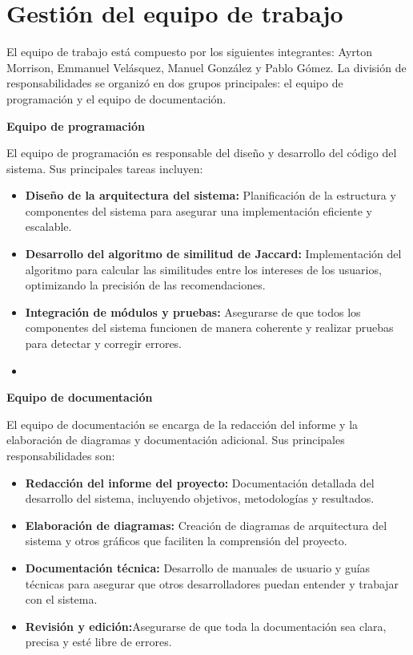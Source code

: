 \section{Gestión del equipo de trabajo}
El equipo de trabajo está compuesto por los siguientes integrantes: Ayrton Morrison, Emmanuel Velásquez, Manuel González y Pablo Gómez. La división de responsabilidades se organizó en dos grupos principales: el equipo de programación y el equipo de documentación.

\textbf{Equipo de programación}

El equipo de programación es responsable del diseño y desarrollo del código del sistema. Sus principales tareas incluyen:

\begin{itemize}
    \item \textbf{Diseño de la arquitectura del sistema:} Planificación de la estructura y componentes del sistema para asegurar una implementación eficiente y escalable.
    \item \textbf{Desarrollo del algoritmo de similitud de Jaccard:} Implementación del algoritmo para calcular las similitudes entre los intereses de los usuarios, optimizando la precisión de las recomendaciones.
    \item \textbf{Integración de módulos y pruebas:} Asegurarse de que todos los componentes del sistema funcionen de manera coherente y realizar pruebas para detectar y corregir errores.
    \item 
\end{itemize}

\textbf{Equipo de documentación}

El equipo de documentación se encarga de la redacción del informe y la elaboración de diagramas y documentación adicional. Sus principales responsabilidades son:

\begin{itemize}
    \item \textbf{Redacción del informe del proyecto:} Documentación detallada del desarrollo del sistema, incluyendo objetivos, metodologías y resultados.
    \item \textbf{Elaboración de diagramas:} Creación de diagramas de arquitectura del sistema y otros gráficos que faciliten la comprensión del proyecto.
    \item \textbf{Documentación técnica:} Desarrollo de manuales de usuario y guías técnicas para asegurar que otros desarrolladores puedan entender y trabajar con el sistema.
    \item \textbf{Revisión y edición:}Asegurarse de que toda la documentación sea clara, precisa y esté libre de errores.
\end{itemize}

